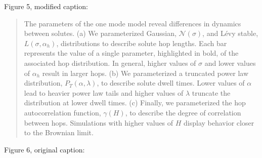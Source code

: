 \documentclass{article}
\begin{document}
\begin{enumerate}[label={Comment \theenumi :}, leftmargin=3.9\parindent]
\begin{quote}
		\end{quote}
		
		Figure 5, modified caption:
		
		\begin{quote}
		
		  The parameters of the one mode model reveal differences in dynamics
	      between solutes. (a) We parameterized Gaussian, $\mathcal{N}(\sigma)$, 
	      and L\'evy stable, $L(\sigma, \alpha_h)$, distributions to describe
	      solute hop lengths. 
	      Each bar represents the value of a single parameter,
	      highlighted in bold, of the associated hop distribution.
	      In general, higher values of $\sigma$ and lower values of $\alpha_h$ 
	      result in larger hops. 
	      (b) We parameterized 
	      a truncated power law distribution, $P_T(\alpha, \lambda)$,  to describe
	      solute dwell times. 
	      Lower values of $\alpha$ lead to heavier power
	      law tails and higher values of $\lambda$ truncate the distribution at
	      lower dwell times. (c) Finally, we parameterized the hop
	      autocorrelation function, $\gamma(H)$, to describe the degree of
	      correlation between hops. Simulations with higher values of $H$ display
	      behavior closer to the Brownian limit.
	      
		\end{quote}
		
		Figure 6, original caption:
	 
	    \begin{quote}


\end{quote}
\end{enumerate}
\end{document}
